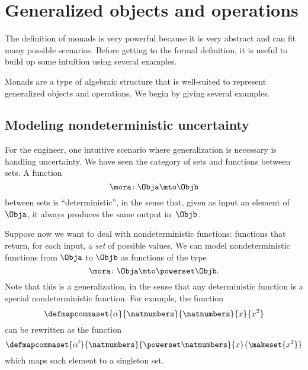 
\section{Generalized objects and operations}

The definition of monads is very powerful because it is very abstract and can fit many possible scenarios.
Before getting to the formal definition, it is useful to build up some intuition using several examples.

Monads are a type of algebraic structure that is well-suited to represent generalized objects and operations.
We begin by giving several examples.

\subsection{Modeling nondeterministic uncertainty}

For the engineer, one intuitive scenario where generalization is necessary is handling uncertainty.
We have seen the category  \Set of sets and functions between sets.
A function
\begin{equation}
    \label{eq:monad-simple}
    \mora\colon\Obja\mto\Objb
\end{equation}
between sets is ``deterministic'', in the sense that, given as input an element of~$\Obja$, it always produces the same output in~$\Objb$.

Suppose now we want to deal with nondeterministic functions: functions that return, for each input, a \emph{set} of possible values.
We can model nondeterministic functions from $\Obja$ to $\Objb$ as functions of the type
\begin{equation}
    \label{eq:monad-generalized}
    \mora\colon\Obja\mto\powerset\Objb.
\end{equation}
%
Note that this is a generalization, in the sense that any deterministic function is a special nondeterministic function.
For example, the function
%
\begin{equation}
    \label{eq:monad-alpha-example1}
    \defmapcommaset{
        \alpha
    }{
        \natnumbers
    }{
        \natnumbers
    }{
        x
    }{
        x^2
    }
\end{equation}
%
can be rewritten as the function
%
\begin{equation}
    \label{eq:monad-alpha-example2}
    \defmapcommaset{
        \alpha'
    }{
        \natnumbers
    }{
        \powerset\natnumbers
    }{
        x
    }{
        \makeset{x^2}
    }
\end{equation}
%
which maps each element to a singleton set.

